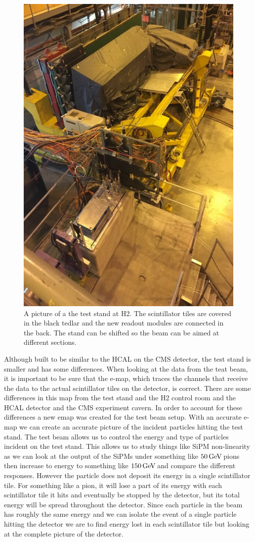 \begin{figure}
\centering
\includegraphics[width=0.4\linewidth]{Figures/Teststand.png}
\caption{A picture of a the test stand at H2. The scintillator tiles are covered in the black tedlar and the new readout modules are connected in the back. The stand can be shifted so the beam can be aimed at different sections.}
\label{fig:stand}
\end{figure}

Although built to be similar to the HCAL on the CMS detector, the test stand is smaller and has some differences. When looking at the data from the teat beam, it is important to be sure that the e-map, which traces the channels that receive the data to the actual scintillator tiles on the detector, is correct. There are some differences in this map from the test stand and the H2 control room and the HCAL detector and the CMS experiment cavern. In order to account for these differences a new emap was created for the test beam setup. With an accurate e-map we can create an accurate picture of the incident particles hitting the test stand. The test beam allows us to control the energy and type of particles incident on the test stand. This allows us to study things like SiPM non-linearity as we can look at the output of the SiPMs under something like $50 {\,\text{Ge\hspace{-.08em}V\hspace{-0.16em}}}$ pions then increase to energy to something like $150 {\,\text{Ge\hspace{-.08em}V\hspace{-0.16em}}}$ and compare the different responses. However the particle does not deposit its energy in a single scintillator tile. For something like a pion, it will lose a part of its energy with each scintillator tile it hits and eventually be stopped by the detector, but its total energy will be spread throughout the detector. Since each particle in the beam has roughly the same energy and we can isolate the event of a single particle hitting the detector we are to find energy lost in each scintillator tile but looking at the complete picture of the detector. 

